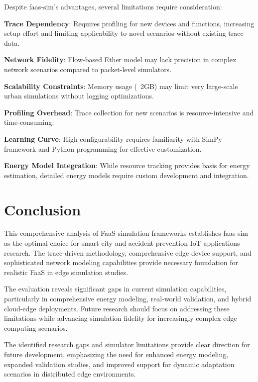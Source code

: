 Despite faas-sim's advantages, several limitations require consideration:

\textbf{Trace Dependency}: Requires profiling for new devices and functions, increasing setup effort and limiting applicability to novel scenarios without existing trace data.

\textbf{Network Fidelity}: Flow-based Ether model may lack precision in complex network scenarios compared to packet-level simulators.

\textbf{Scalability Constraints}: Memory usage (~2GB) may limit very large-scale urban simulations without logging optimizations.

\textbf{Profiling Overhead}: Trace collection for new scenarios is resource-intensive and time-consuming.

\textbf{Learning Curve}: High configurability requires familiarity with SimPy framework and Python programming for effective customization.

\textbf{Energy Model Integration}: While resource tracking provides basis for energy estimation, detailed energy models require custom development and integration.
\section{Conclusion}

This comprehensive analysis of FaaS simulation frameworks establishes faas-sim as the optimal choice for smart city and accident prevention IoT applications research. The trace-driven methodology, comprehensive edge device support, and sophisticated network modeling capabilities provide necessary foundation for realistic FaaS in edge simulation studies.

The evaluation reveals significant gaps in current simulation capabilities, particularly in comprehensive energy modeling, real-world validation, and hybrid cloud-edge deployments. Future research should focus on addressing these limitations while advancing simulation fidelity for increasingly complex edge computing scenarios.

The identified research gaps and simulator limitations provide clear direction for future development, emphasizing the need for enhanced energy modeling, expanded validation studies, and improved support for dynamic adaptation scenarios in distributed edge environments.